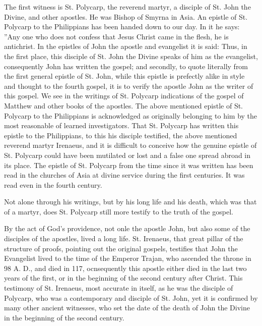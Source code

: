 The first witness is St. Polycarp, the reverend martyr, a disciple of St. John the Divine, and other apostles. He was Bishop of Smyrna in Asia. An epistle of St. Polycarp to the Philippians has been handed down to our day. In it he says: ''Any one who does not confess that Jesus Christ came in the flesh, he is antichrist. In the epistles of John the apostle and evangelist it is said:  Thus, in the first place, this disciple of St. John the Divine speaks of him as the evangelist, consequently John has written the gospel; and secondly, to quote literally from the first general epistle of St. John, while this epistle is prefectly alike in style and thought to the fourth gospel, it is to verify the apostle John as the writer of this gospel. We see in the writings of St. Polycarp indications of the gospel of Matthew and other books of the apostles. The above mentioned epistle of St. Polycarp to the Philippians is acknowledged as originally belonging to him by the most reasonable of learned investigators. That St. Polycarp has written this epistle to the Philippians, to this his disciple testified, the above mentioned reverend martyr Irenaeus, and it is difficult to conceive how the genuine epistle of St. Polycarp could have been mutilated or lost and a false one spread abroad in its place. The epistle of St. Polycarp from the time since it was written has been read in the churches of Asia at divine service during the first centuries. It was read even in the fourth century.

Not alone through his writings, but by his long life and his death, which was that of a martyr, does St. Polycarp still more testify to the truth of the gospel.

By the act of God's providence, not onle the apostle John, but also some of the disciples of the apostles, lived a long life. St. Irenaeus, that great pillar of the structure of proofs, pointing out the original gospels, testifies that John the Evangelist lived to the time of the Emperor Trajan, who ascended the throne in 98 A. D., and died in 117, ocnsequently this apostle either died in the last two years of the first, or in the beginning of the second century after Christ. This testimony of St. Irenaeus, most accurate in itself, as he was the disciple of Polycarp, who was a contemporary and disciple of St. John, yet it is confirmed by many other ancient witnesses, who set the date of the death of John the Divine in the beginning of the second century.

